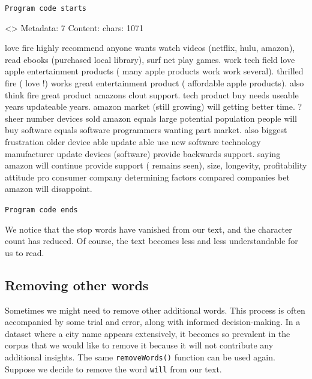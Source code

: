 \texttt{Program\ code\ starts}

\begin{Shaded}
\begin{Highlighting}[]
\OtherTok{\textless{}{-}} \NormalTok{(}\NormalTok{))}

\NormalTok{(docs[[}\NormalTok{]])}
\end{Highlighting}
\end{Shaded}

\textless{}\textgreater{} Metadata: 7 Content: chars: 1071

love fire highly recommend anyone wants watch videos (netflix, hulu,
amazon), read ebooks (purchased local library), surf net play games.
work tech field love apple entertainment products ( many apple products
work work several). thrilled fire ( love !) works great entertainment
product ( affordable apple products). also think fire great product
amazons clout support. tech product buy needs useable years updateable
years. amazon market (still growing) will getting better time. ? sheer
number devices sold amazon equals large potential population people will
buy software equals software programmers wanting part market. also
biggest frustration older device able update able use new software
technology manufacturer update devices (software) provide backwards
support. saying amazon will continue provide support ( remains seen),
size, longevity, profitability attitude pro consumer company determining
factors compared companies bet amazon will disappoint.

\texttt{Program\ code\ ends}

We notice that the stop words have vanished from our
text, and the character count has reduced. Of course, the text becomes less
and less understandable for us to read.

\subsection{Removing other words}\label{own-dictionary-words-removal}

Sometimes we might need to remove other additional words. This process
is often accompanied by some trial and error, along with
informed decision-making. In a dataset where a city name appears
extensively, it becomes so prevalent in the corpus that we would like to
remove it because it will not contribute any additional insights. The
same \texttt{removeWords()} function can be used again. Suppose we
decide to remove the word \texttt{will} from our text.

